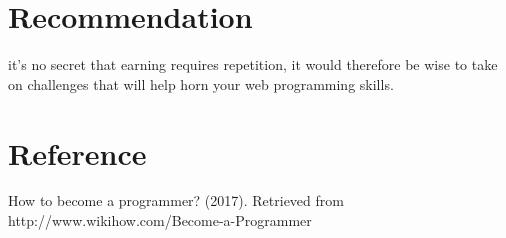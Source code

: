 \documentclass[options]{article}
\begin{document}
\section{\textbf{Recommendation}}
it’s no secret that earning requires repetition, it would therefore be wise to take on challenges that will help horn your web programming skills.

\section{\textbf{Reference}}
How to become a programmer? (2017). Retrieved from http://www.wikihow.com/Become-a-Programmer
\end{document}
